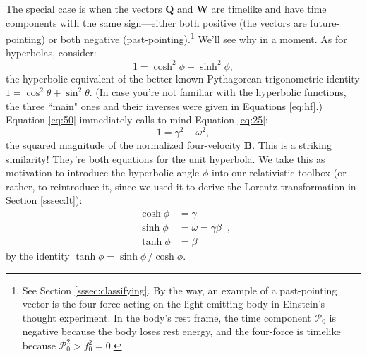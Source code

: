 \documentclass[12pt]{article}
\renewcommand{\vv}[1]{\mathbf{#1}}
\begin{document}
The special case is when the vectors $\vv Q$ and $\vv W$ are timelike and have time components with the same sign---either both positive (the vectors are future-pointing) or both negative (past-pointing).\footnote{\label{fn:nt}See Section \ref{sssec:classifying}. By the way, an example of a past-pointing vector is the four-force acting on the light-emitting body in Einstein's thought experiment. In the body's rest frame, the time component $\mathcal{P}_0$ is negative because the body loses rest energy, and the four-force is timelike because $\mathcal{P}_0^2 > f_0^2 = 0$.} We'll see why in a moment. As for hyperbolas, consider:
\begin{equation}\label{eq:50}
1 = \cosh^2 {\phi} - \sinh^2 {\phi},
\end{equation}
the hyperbolic equivalent of the better-known Pythagorean trigonometric identity $1 = \cos^2 {\theta} + \sin^2 {\theta}$. (In case you're not familiar with the hyperbolic functions, the three ``main" ones and their inverses were given in Equations \ref{eq:hf}.) Equation \ref{eq:50} immediately calls to mind Equation \ref{eq:25}:
\begin{equation*}
1 = \gamma^2 - \omega^2 ,
\end{equation*}
the squared magnitude of the normalized four-velocity $\vv B$. This is a striking similarity! They're both equations for the unit hyperbola. We take this as motivation to introduce the hyperbolic angle $\phi$ into our relativistic toolbox (or rather, to reintroduce it, since we used it to derive the Lorentz transformation in Section \ref{sssec:lt}):
\begin{equation}\label{eq:51}
\boxed{
\begin{aligned}
\cosh{\phi} &= \gamma \\
\sinh{\phi} &= \omega = \gamma \beta \\
\tanh{\phi} &= \beta
\end{aligned}
} \, ,
\end{equation}
by the identity $\tanh{\phi} = \sinh{\phi} \, / \cosh{\phi}$.
\end{document}
